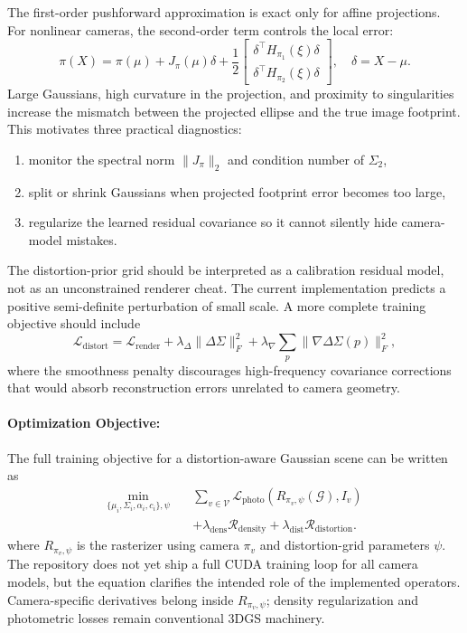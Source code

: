 \documentclass{article}
\begin{document}
The first-order pushforward approximation is exact only for affine projections. For nonlinear cameras, the second-order term controls the local error:
\begin{equation}
  \pi(X) = \pi(\mu) + J_{\pi}(\mu)\delta + \frac{1}{2}
  \begin{bmatrix}
  \delta^\top H_{\pi_1}(\xi)\delta\\
  \delta^\top H_{\pi_2}(\xi)\delta
  \end{bmatrix},
  \quad \delta=X-\mu.
\end{equation}
Large Gaussians, high curvature in the projection, and proximity to singularities increase the mismatch between the projected ellipse and the true image footprint. This motivates three practical diagnostics:
\begin{enumerate}
  \item monitor the spectral norm $\|J_{\pi}\|_2$ and condition number of $\Sigma_2$,
  \item split or shrink Gaussians when projected footprint error becomes too large,
  \item regularize the learned residual covariance so it cannot silently hide camera-model mistakes.
\end{enumerate}

The distortion-prior grid should be interpreted as a calibration residual model, not as an unconstrained renderer cheat. The current implementation predicts a positive semi-definite perturbation of small scale. A more complete training objective should include
\begin{equation}
  \mathcal{L}_{\text{distort}} =
  \mathcal{L}_{\text{render}} +
  \lambda_{\Delta}\|\Delta\Sigma\|_F^2 +
  \lambda_{\nabla}\sum_{p}\|\nabla \Delta\Sigma(p)\|_F^2,
\end{equation}
where the smoothness penalty discourages high-frequency covariance corrections that would absorb reconstruction errors unrelated to camera geometry.

\paragraph{Optimization Objective:}

The full training objective for a distortion-aware Gaussian scene can be written as
\begin{equation}
\begin{aligned}
\min_{\{\mu_i,\Sigma_i,\alpha_i,c_i\},\psi}\quad
&\sum_{v\in\mathcal{V}}\mathcal{L}_{\text{photo}}\left(R_{\pi_v,\psi}(\mathcal{G}), I_v\right)\\
&+\lambda_{\text{dens}}\mathcal{R}_{\text{density}}
+\lambda_{\text{dist}}\mathcal{R}_{\text{distortion}} .
\end{aligned}
\end{equation}
where $R_{\pi_v,\psi}$ is the rasterizer using camera $\pi_v$ and distortion-grid parameters $\psi$. The repository does not yet ship a full CUDA training loop for all camera models, but the equation clarifies the intended role of the implemented operators. Camera-specific derivatives belong inside $R_{\pi_v,\psi}$; density regularization and photometric losses remain conventional 3DGS machinery.
\end{document}
